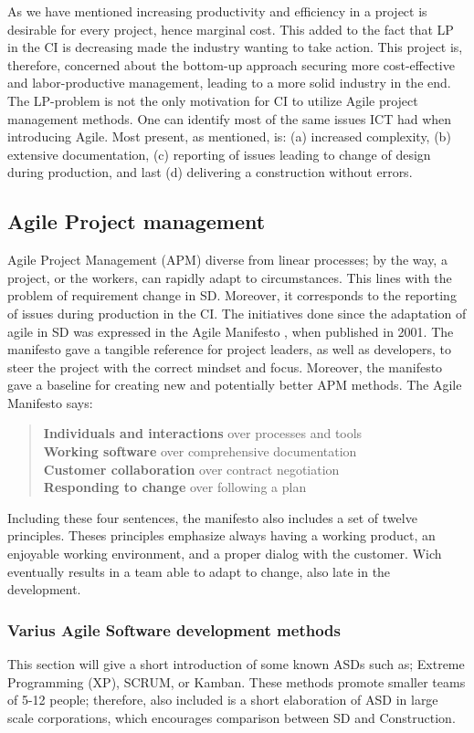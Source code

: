 As we have mentioned increasing productivity and efficiency in a project is desirable for every project, hence marginal cost. This added to the fact that LP in the CI is decreasing made the industry wanting to take action. This project is, therefore, concerned about the bottom-up approach securing more cost-effective and labor-productive management, leading to a more solid industry in the end. The LP-problem is not the only motivation for CI to utilize Agile project management methods. One can identify most of the same issues ICT had when introducing Agile. Most present, as mentioned, is: (a) increased complexity, (b) extensive documentation, (c) reporting of issues leading to change of design during production, and last (d) delivering a construction without errors.

\subsection{Agile Project management}
Agile Project Management (APM) diverse from linear processes; by the way, a project, or the workers, can rapidly adapt to circumstances. This lines with the problem of requirement change in SD. Moreover, it corresponds to the reporting of issues during production in the CI. The initiatives done since the adaptation of agile in SD was expressed in the Agile Manifesto \cite{agile_manifesto}, when published in 2001. The manifesto gave a tangible reference for project leaders, as well as developers, to steer the project with the correct mindset and focus. Moreover, the manifesto gave a baseline for creating new and potentially better APM methods. The Agile Manifesto says:
\begin{quotation}
    {\noindent \bf Individuals and interactions} over processes and tools \\
    {\bf Working software} over comprehensive documentation \\
    {\bf Customer collaboration} over contract negotiation \\
    {\bf Responding to change} over following a plan \\
\end{quotation}
Including these four sentences, the manifesto also includes a set of twelve principles. Theses principles emphasize always having a working product, an enjoyable working environment, and a proper dialog with the customer. Wich eventually results in a team able to adapt to change,  also late in the development.

\subsubsection{Varius Agile Software development methods}
This section will give a short introduction of some known ASDs such as; Extreme Programming (XP), SCRUM, or Kamban. These methods promote smaller teams of 5-12 people; therefore, also included is a short elaboration of ASD in large scale corporations, which encourages comparison between SD and Construction.

